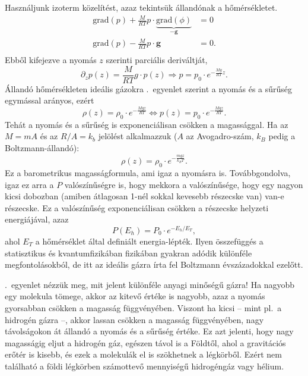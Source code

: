 \documentclass[12pt,a4paper]{scrartcl}
\let\mathbf\bm
\begin{document}
Használjunk izoterm közelítést, azaz tekintsük állandónak a hőmérsékletet.
\[\begin{aligned}
  {\text{grad}}\left( p \right) + \frac{M}{{RT}}p \cdot \underbrace {{\text{grad}}\left( \phi  \right)}_{ - {\mathbf{g}}} &  = 0 \\ 
  {\text{grad}}\left( p \right) - \frac{M}{{RT}}p \cdot {\mathbf{g}} &  = 0.\\ 
\end{aligned} \]
Ebből kifejezve a nyomás $z$ szerinti parciális deriváltját,
\[{\partial _z}p\left( z \right) = \frac{M}{{RT}}g \cdot p\left( z \right) \Rightarrow p = {p_0} \cdot {e^{ - \frac{{Mg}}{{RT}}z}}.\]
Állandó hőmérsékleten ideális gázokra .\ egyenlet szerint a nyomás és a sűrűség egymással arányos, ezért
\begin{equation}
\rho \left( z \right) = {\rho _0} \cdot {e^{ - \frac{{Mgz}}{{RT}}}} \Leftrightarrow p\left( z \right) = {p_0} \cdot {e^{ - \frac{{Mgz}}{{RT}}}}.
\end{equation}
Tehát a nyomás és a sűrűség is exponenciálisan csökken a magassággal. Ha az $M=mA$ és az $R/A=k_b$ jelölést alkalmazzuk ($A$ az Avogadro-szám, $k_B$ pedig a Boltzmann-állandó):
\begin{equation} \label{eq:barometrikus_magassagformula}
\rho \left( z \right) = {\rho _0} \cdot {e^{ - \frac{{mgz}}{{{k_B}T}}}}.
\end{equation}
Ez a barometrikus magasságformula, ami igaz a nyomásra is. Továbbgondolva, igaz ez arra a $P$ valószínűségre is, hogy mekkora a valószínűsége, hogy egy nagyon kicsi dobozban (amiben átlagosan 1-nél sokkal kevesebb részecske van) van-e részecske. Ez a valószínűség exponenciálisan csökken a részecske helyzeti energiájával, azaz
\[P\left( {{E_h}} \right) = {P_0} \cdot {e^{ - {E_h}/{E_T}}},\] ahol ${{E_T}}$ a hőmérséklet által definiált energia-lépték. Ilyen összefüggés a statisztikus és kvantumfizikában fizikában gyakran adódik különféle megfontolásokból, de itt az ideális gázra írta fel Boltzmann évszázadokkal ezelőtt.

.\ egyenlet nézzük meg, mit jelent különféle anyagi minőségű gázra! Ha nagyobb egy molekula tömege, akkor az kitevő értéke is nagyobb, azaz a nyomás gyorsabban csökken a magasság függvényében. Viszont ha kicsi -- mint pl.\ a hidrogén gázra --, akkor lassan csökken a magasság függvényében, nagy távolságokon át állandó a nyomás és a sűrűség értéke. Ez azt jelenti, hogy nagy magasságig eljut a hidrogén gáz, egészen távol is a Földtől, ahol a gravitációs erőtér is kisebb, és ezek a molekulák el is szökhetnek a légkörből. Ezért nem található a földi légkörben számottevő mennyiségű hidrogéngáz vagy hélium.
\end{document}
